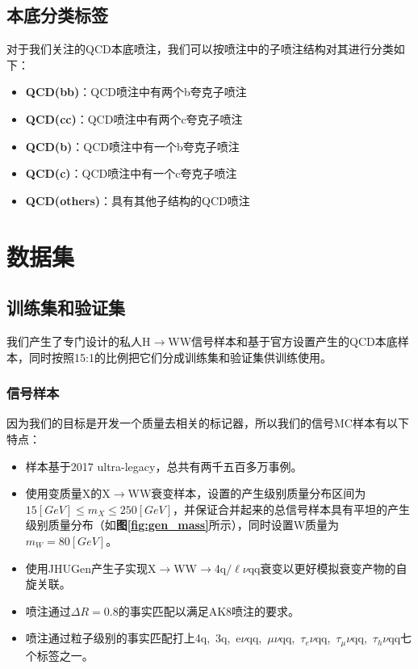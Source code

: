 \subsection{本底分类标签}
对于我们关注的QCD本底喷注，我们可以按喷注中的子喷注结构对其进行分类如下：
\begin{itemize}\label{eq:5.2}
    \item \textbf{QCD(bb)}：QCD喷注中有两个b夸克子喷注
    \item \textbf{QCD(cc)}：QCD喷注中有两个c夸克子喷注
    \item \textbf{QCD(b)}：QCD喷注中有一个b夸克子喷注
    \item \textbf{QCD(c)}：QCD喷注中有一个c夸克子喷注
    \item \textbf{QCD(others)}：具有其他子结构的QCD喷注
\end{itemize}

\section{数据集}
\subsection{训练集和验证集}
我们产生了专门设计的私人H$\to$WW信号样本和基于官方设置产生的QCD本底样本，同时按照15:1的比例把它们分成训练集和验证集供训练使用。
\subsubsection{信号样本}
因为我们的目标是开发一个质量去相关的标记器，所以我们的信号MC样本有以下特点：
\begin{itemize}
    \item 样本基于2017 ultra-legacy，总共有两千五百多万事例。
    \item 使用变质量X的X$\to$WW衰变样本，设置的产生级别质量分布区间为$15 [\si{GeV}]\leq m_X\leq 250[\si{GeV}]$，并保证合并起来的总信号样本具有平坦的产生级别质量分布（如\textbf{图\ref{fig:gen_mass}}所示），同时设置W质量为$m_W=80[\si{GeV}]$。
    \item 使用JHUGen产生子实现X$\to$WW$\to$4q$/\ell \nu$qq衰变以更好模拟衰变产物的自旋关联。
    \item 喷注通过$\Delta R=0.8$的事实匹配以满足AK8喷注的要求。
    \item 喷注通过粒子级别的事实匹配打上4q,\ 3q,\ e$\nu$qq,\ $\mu\nu$qq,\ $\tau_e\nu$qq,\ $\tau_\mu\nu$qq,\ $\tau_h\nu$qq七个标签之一。
\end{itemize}

